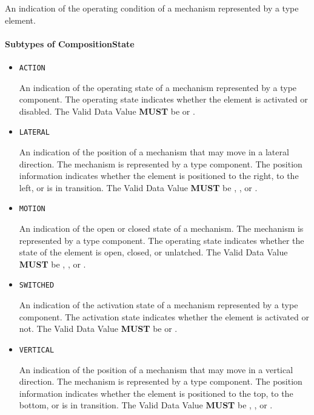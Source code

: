 An indication of the operating condition of a mechanism represented by a  type element.


\paragraph{Subtypes of CompositionState}\mbox{}
\label{sec:Subtypes of CompositionState}

\begin{itemize}

\item \texttt{ACTION}


An indication of the operating state of a mechanism represented by a  type component.
 The operating state indicates whether the  element is activated or disabled. 
 The \gls{Valid Data Value} \textbf{MUST} be  or .

\item \texttt{LATERAL}


An indication of the position of a mechanism that may move in a lateral direction.   The mechanism is represented by a  type component. 
 The position information indicates whether the  element is positioned to the right, to the left, or is in transition.  
 The \gls{Valid Data Value} \textbf{MUST} be , , or .

\item \texttt{MOTION}


An indication of the open or closed state of a mechanism.   The mechanism is represented by a  type component. 
 The operating state indicates whether the state of the  element is open, closed, or unlatched.   
 The \gls{Valid Data Value} \textbf{MUST} be , , or .

\item \texttt{SWITCHED}


An indication of the activation state of a mechanism represented by a  type component.
 The activation state indicates whether the  element is activated or not.
 The \gls{Valid Data Value} \textbf{MUST} be  or .

\item \texttt{VERTICAL}


An indication of the position of a mechanism that may move in a vertical direction. The mechanism is represented by a  type component. 
 The position information indicates whether the  element is positioned to the top, to the bottom, or is in transition.  
 The \gls{Valid Data Value} \textbf{MUST} be , , or .


\end{itemize}

